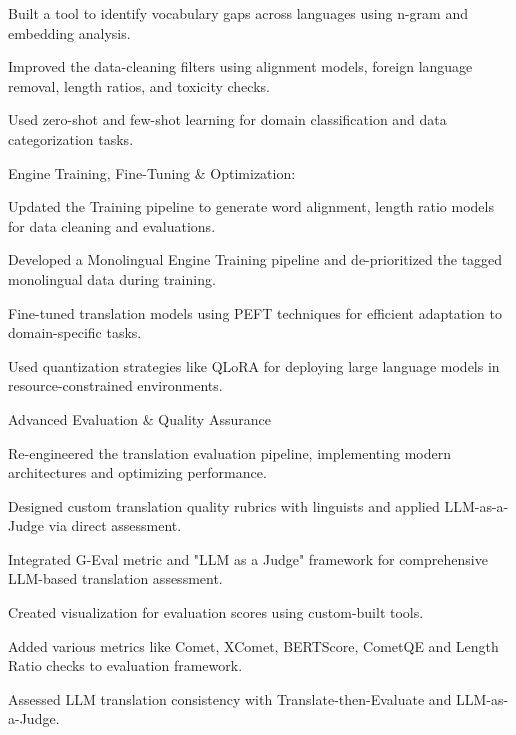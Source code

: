 \begin{cventries}
{\begin{cvitemswithheading}
        \item {Built a tool to identify vocabulary gaps across languages using n-gram and embedding analysis.}
        \item {Improved the data-cleaning filters using alignment models, foreign language removal, length ratios, and toxicity checks.}
        \item {Used zero-shot and few-shot learning for domain classification and data categorization tasks.}
    \end{cvitemswithheading}
  }
  \cvexpproj
  {
    \begin{cvitemswithheading}
        {Engine Training, Fine-Tuning \& Optimization:}
        \item {Updated the Training pipeline to generate word alignment, length ratio models for data cleaning and evaluations.}
        \item {Developed a Monolingual Engine Training pipeline and de-prioritized the tagged monolingual data during training.}
        \item {Fine-tuned translation models using PEFT techniques for efficient adaptation to domain-specific tasks.}
        \item {Used quantization strategies like QLoRA for deploying large language models in resource-constrained environments.}
      \end{cvitemswithheading}
  }
  \cvexpproj
  {
    \begin{cvitemswithheading}
        {Advanced Evaluation \& Quality Assurance}
        \item {Re-engineered the translation evaluation pipeline, implementing modern architectures and optimizing performance.}
        \item {Designed custom translation quality rubrics with linguists and applied LLM-as-a-Judge via direct assessment.}
        \item {Integrated G-Eval metric and "LLM as a Judge" framework for comprehensive LLM-based translation assessment.}
        \item {Created visualization for evaluation scores using custom-built tools.}
        \item {Added various metrics like Comet, XComet, BERTScore, CometQE and Length Ratio checks to evaluation framework.}
        \item {Assessed LLM translation consistency with Translate-then-Evaluate and LLM-as-a-Judge.}
    \end{cvitemswithheading}
  }
  \cvexperiencecontinued

\end{cventries}
